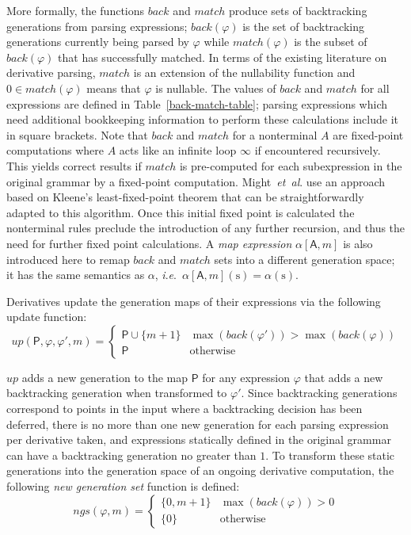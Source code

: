 \documentclass[submission,copyright,creativecommons]{eptcs}
\newcommand{\str}{\mathrm{s}}
\newcommand{\g}[1]{\mathsf{#1}}
\newcommand{\upd}{up}
\newcommand{\ngs}{ngs}
\newcommand{\ie}{\textit{i}.\textit{e}.}
\newcommand{\etal}{\textit{et~al}. }
\begin{document}
More formally, the functions $back$ and $match$ produce sets of backtracking generations from parsing expressions; $back(\varphi)$ is the set of backtracking generations currently being parsed by $\varphi$ while $match(\varphi)$ is the subset of $back(\varphi)$ that has successfully matched. In terms of the existing literature on derivative parsing, $match$ is an extension of the nullability function and $0 \in match(\varphi)$ means that $\varphi$ is nullable. 
The values of $back$ and $match$ for all expressions are defined in Table~\ref{back-match-table}; parsing expressions which need additional bookkeeping information to perform these calculations include it in square brackets. 
Note that $back$ and $match$ for a nonterminal $A$ are fixed-point computations where $A$ acts like an infinite loop $\infty$ if encountered recursively. 
This yields correct results if $match$ is pre-computed for each subexpression in the original grammar by a fixed-point computation. 
Might~\etal \cite{MDS11} use an approach based on Kleene's least-fixed-point theorem that can be straightforwardly adapted to this algorithm. 
Once this initial fixed point is calculated the nonterminal rules preclude the introduction of any further recursion, and thus the need for further fixed point calculations. 
A \emph{map expression} $\alpha[\g{A},m]$ is also introduced here to remap $back$ and $match$ sets into a different generation space; it has the same semantics as $\alpha$, \ie\ $\alpha[\g{A},m](\str) = \alpha(\str)$.

Derivatives update the generation maps of their expressions via the following update function: 
\[\upd(\g{P},\varphi,\varphi',m) = \begin{cases} \g{P} \cup \{m+1\} & \max(back(\varphi')) > \max(back(\varphi)) \\
                                                 \g{P}              & \text{otherwise} \end{cases}\]

$up$ adds a new generation to the map $\g{P}$ for any expression $\varphi$ that adds a new backtracking generation when transformed to $\varphi'$. 
Since backtracking generations correspond to points in the input where a backtracking decision has been deferred, there is no more than one new generation for each parsing expression per derivative taken, and expressions statically defined in the original grammar can have a backtracking generation no greater than $1$. 
To transform these static generations into the generation space of an ongoing derivative computation, the following \emph{new generation set} function is defined:  
\[\ngs(\varphi,m) = \begin{cases} \{0,m+1\} & \max(back(\varphi)) > 0 \\
                                  \{0\}     & \text{otherwise} \end{cases}\]
\end{document}
